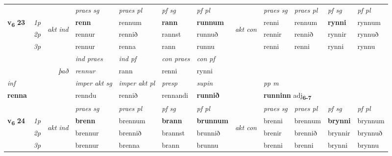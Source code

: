 \begin{longtable}[l]{X>{\footnotesize\itshape}llXXXXlXXXX}
\midrule

 & &   & \textit{praes sg}  & \textit{praes pl}    & \textit{ pf sg} & \textit{pf pl} & & \textit{praes sg}  & \textit{praes pl}    & \textit{pf sg} & \textit{pf pl }  \\ \cmidrule{4-7} \cmidrule{9-12}
 \multirow{2}{*}{{{\textbf{v{\textsubscript{6}}} \Large{\textbf{23}}}}}  & 1p & \multirow{3}{*}{\begin{turn}{90}\textit{akt ind}\end{turn}} & \textbf{renn} & rennum & \textbf{rann} & \textbf{runnum} & \multirow{3}{*}{\begin{turn}{90}\textit{akt con}\end{turn}} &renni & rennum & \textbf{rynni} & rynnum\\*
 & 2p &  &  rennur  & rennið & rannst & runnuð & & rennir & rennið & rynnir & rynnuð \\*
 & 3p &  & rennur & renna & rann & runnu & & renni & renni& rynni & rynnu \\*
\cmidrule{4-7} \cmidrule{9-12}

   && &  \textit{ind praes} & \textit{ind pf} & \textit{con praes} & \textit{con pf} \\*
\multicolumn{3}{r}{\textit{það}} & rennur & rann & renni & rynni \\*

\cmidrule{4-7}
   {\textit{inf}} & &  & \textit{imper akt sg} & \textit{imper akt pl}   & \textit{presp} & \textit{supin}  && \textit{pp m} \\*
  {\textbf{renna}} & && renndu  & rennið   & rennandi &  \textbf{runnið}  && \multicolumn{2}{l}{\textbf{runninn} adj\textbf{\textsubscript{6-7}}} \\*

\midrule

 & &   & \textit{praes sg}  & \textit{praes pl}    & \textit{ pf sg} & \textit{pf pl} & & \textit{praes sg}  & \textit{praes pl}    & \textit{pf sg} & \textit{pf pl }  \\ \cmidrule{4-7} \cmidrule{9-12}
 \multirow{2}{*}{{{\textbf{v{\textsubscript{6}}} \Large{\textbf{24}}}}}  & 1p & \multirow{3}{*}{\begin{turn}{90}\textit{akt ind}\end{turn}} & \textbf{brenn} & brennum & \textbf{brann} & \textbf{brunnum} & \multirow{3}{*}{\begin{turn}{90}\textit{akt con}\end{turn}} &brenni & brennum & \textbf{brynni} & brynnum\\*
 & 2p &  &  brennur  & brennið & brannst & brunnið & & brenir & brennið & brynnir & brynnuð \\*
 & 3p &  & brennur & brenna & brann & brunnu & & brenni & brenni& brynni & brynnu \\*
\cmidrule{4-7} \cmidrule{9-12}


\end{longtable}
